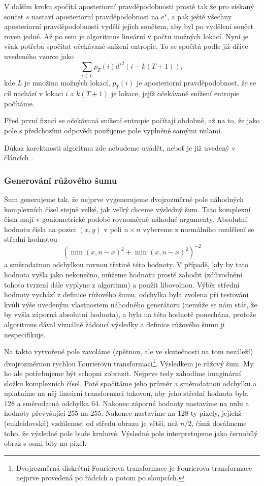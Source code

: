V dalším kroku spočítá aposteriorní pravděpodobnosti prostě tak že pro získaný
součet $s$ nastaví aposteriorní pravděpodobnost na $e^s$, a pak ještě všechny
aposteriorní pravděpodobnosti vydělí jejich součtem, aby byl po vydělení součet
roven jedné. Až po sem je algoritmus lineární v počtu možných lokací. Nyní je
však potřeba spočítat očekávané snížení entropie. To se spočítá podle již dříve
uvedeného vzorce jako $$\displaystyle\sum_{i\in L} p_T(i)d'^2(i-k(T+1)),$$ kde
$L$ je množina možných lokací, $p_T(i)$ je aposteriorní pravděpodobnost, že se
cíl nachází v lokaci $i$ a $k(T+1)$ je lokace, jejíž očekávané snížení entropie
počítáme.   

Před první fixací se očekávaná snížení entropie počítají obdobně, až na to, že
jako pole s předchozími odpovědi použijeme pole vyplněné samými nulami.

Důkaz korektnosti algoritmu zde nebudeme uvádět, neboť je již uvedený v článcích \citep{Najemnik05, Najemnik08, Najemnik09}.

\subsubsection*{Generování růžového šumu}


Šum generujeme tak, že nejprve vygenerujeme dvojrozměrné pole náhodných
komplexních čísel stejně velké, jak velký chceme výsledný šum. Tato komplexní
čísla mají v goniometrické podobě rovnoměrně náhodné argumenty. Absolutní
hodnotu čísla na pozici $(x,y)$ v poli $n\times n$ vybereme z normálního
rozdělení se střední hodnotou \begin{equation}\label{Pink}\left(\min\left(x,n-x\right)^2
+\min\left(x,n-x\right)^2\right)^{-2}\end{equation} a směrodatnou odchylkou rovnou třetině
této hodnoty. V případě, kdy by tato hodnota vyšla jako nekonečno, můžeme
hodnotu prostě zahodit (zdůvodnění tohoto tvrzení dále vyplyne z algoritmu) a
použít libovolnou. Výběr střední hodnoty vychází z definice růžového šumu,
odchylka byla zvolena při testování kvůli výše uvedeným vlastnostem náhodného
generátoru (nemůže se nám stát, že by vyšla záporná absolutní hodnota), a byla
na této hodnotě ponechána, protože algoritmus dával vizuálně žádoucí výsledky a
definice růžového šumu ji nespecifikuje.

Na takto vytvořené pole zavoláme (zpětnou, ale ve skutečnosti na tom nezáleží)
dvojrozměrnou rychlou Fourierovu transformaci\footnote{Dvojrozměrná diskrétní
Fourierova transformace je Fourierova transformace nejprve provedená po řádcích
a potom po sloupcích.}.  Výsledkem je růžový šum. My ho ale potřebujeme být
schopni zobrazit. Nejprve tedy zahodíme imaginární složku komplexních čísel.
Poté spočítáme jeho průměr a směrodatnou odchylku a uplatníme na něj lineární
transformaci takovou, aby jeho střední hodnota byla 128 a směrodatná odchylka
64. Nakonec záporné hodnoty nastavíme na nulu a hodnoty převyšující 255 na 255.
Nakonec nastavíme na 128 ty pixely, jejichž (eukleidovská) vzdálenost od středu
obrazu je větší, než $n/2$, čímž dosáhneme toho, že výsledné pole bude kruhové.
Výsledné pole interpretujeme jako černobílý obraz s osmi bity na pixel.


